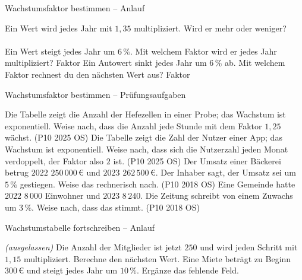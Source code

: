\begin{aufgabe}{Wachstumsfaktor bestimmen – Anlauf}
\begin{teile}
\teil Ein Wert wird jedes Jahr mit $1{,}35$ multipliziert. Wird er mehr oder weniger? \\  \\ 
\teil Ein Wert steigt jedes Jahr um $6\,\%$. Mit welchem Faktor wird er jedes Jahr multipliziert? Faktor \leerfeld
\teil Ein Autowert sinkt jedes Jahr um $6\,\%$ ab. Mit welchem Faktor rechnest du den nächsten Wert aus? Faktor \leerfeld
\end{teile}
\end{aufgabe}

\begin{aufgabe}{Wachstumsfaktor bestimmen – Prüfungsaufgaben}
\begin{teile}
\steil Die Tabelle zeigt die Anzahl der Hefezellen in einer Probe; das Wachstum ist exponentiell. Weise nach, dass die Anzahl jede Stunde mit dem Faktor $1{,}25$ wächst. \hfill (P10 2025 OS) 
\steil Die Tabelle zeigt die Zahl der Nutzer einer App; das Wachstum ist exponentiell. Weise nach, dass sich die Nutzerzahl jeden Monat verdoppelt, der Faktor also $2$ ist. \hfill (P10 2025 OS) 
\teil Der Umsatz einer Bäckerei betrug $2022$ $250\,000\,€$ und $2023$ $262\,500\,€$. Der Inhaber sagt, der Umsatz sei um $5\,\%$ gestiegen. Weise das rechnerisch nach. \hfill (P10 2018 OS)
\teil Eine Gemeinde hatte $2022$ $8\,000$ Einwohner und $2023$ $8\,240$. Die Zeitung schreibt von einem Zuwachs um $3\,\%$. Weise nach, dass das stimmt. \hfill (P10 2018 OS)
\end{teile}
\end{aufgabe}

\begin{aufgabe}{Wachstumstabelle fortschreiben – Anlauf}
\begin{teile}
\teil \textit{(ausgelassen)}
\teil Die Anzahl der Mitglieder ist jetzt $250$ und wird jeden Schritt mit $1{,}15$ multipliziert. Berechne den nächsten Wert. \leerfeld
\teil Eine Miete beträgt zu Beginn $300\,€$ und steigt jedes Jahr um $10\,\%$. Ergänze das fehlende Feld. 
\end{teile}
\end{aufgabe}

